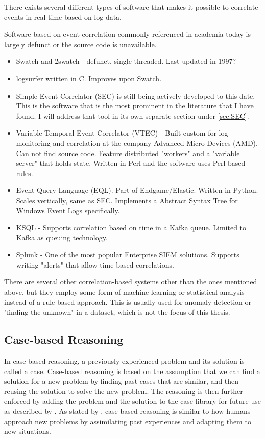 There exists several different types of software that makes it possible to correlate events in real-time based on log data.

Software based on event correlation commonly referenced in academia today is largely defunct or the source code is unavailable. 

\begin{itemize}
    \item Swatch and 2swatch - defunct, single-threaded. Last updated in 1997?
    \item logsurfer \textcite{thompson_2017} written in C. Improves upon Swatch.
    \item Simple Event Correlator (SEC) is still being actively developed to this date. This is the software that is the most prominent in the literature that I have found. I will address that tool in its own separate section under \ref{sec:SEC}.
    \item Variable Temporal Event Correlator (VTEC) - Built custom for log monitoring and correlation at the company Advanced Micro Devices (AMD). Can not find source code. Feature distributed "workers" and a "variable server" that holds state. Written in Perl and the software uses Perl-based rules.
    \item Event Query Language (EQL). Part of Endgame/Elastic. Written in Python. Scales vertically, same as SEC. Implements a Abstract Syntax Tree for Windows Event Logs specifically.
    \item KSQL - Supports correlation based on time in a Kafka queue. Limited to Kafka as queuing technology.
    \item Splunk - One of the most popular Enterprise SIEM solutions. Supports writing "alerts" that allow time-based correlations.
\end{itemize}
There are several other correlation-based systems other than the ones mentioned above, but they employ some form of machine learning or statistical analysis instead of a rule-based approach. This is usually used for anomaly detection or "finding the unknown" in a dataset, which is not the focus of this thesis.

\subsection{Case-based Reasoning}

In case-based reasoning, a previously experienced problem and its solution is called a case. Case-based reasoning is based on the assumption that we can find a solution for a new problem by finding past cases that are similar, and then reusing the solution to solve the new problem. The reasoning is then further enforced by adding the problem and the solution to the case library for future use as described by \textcite{aamodt_1994}.
As stated by \textcite{slade_1991}, case-based reasoning is similar to how humans approach new problems by assimilating past experiences and adapting them to new situations.

